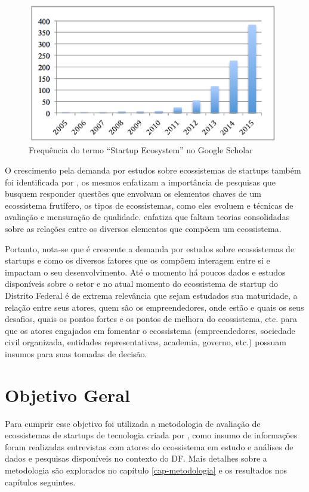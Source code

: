 \begin{figure}[!htb]
	\centering
	\includegraphics[width=11cm,angle=0]{figuras/papers_about_startup_ecosystems}
	\caption{Frequência do termo ``Startup Ecosystem'' no Google Scholar}
	\label{figure:papers_about_startup_ecosystems}
\end{figure}

O crescimento pela demanda por estudos sobre ecossistemas de startups também foi identificada por , os mesmos enfatizam a importância de pesquisas que busquem responder questões que envolvam os elementos chaves de um ecossistema frutífero, os tipos de ecossistemas, como eles evoluem e técnicas de avaliação e mensuração de qualidade.  enfatiza que faltam teorias consolidadas sobre as relações entre os diversos elementos que compõem um ecossistema.

Portanto, nota-se que é crescente a demanda por estudos sobre ecossistemas de startups e como os diversos fatores que os compõem interagem entre si e impactam o seu desenvolvimento. Até o momento há poucos dados e estudos disponíveis sobre o setor e no atual momento do ecossistema de startup do Distrito Federal é de extrema relevância que sejam estudados sua maturidade, a relação entre seus atores, quem são os empreendedores, onde estão e quais os seus desafios, quais os pontos fortes e os pontos de melhora do ecossistema, etc. para que os atores engajados em fomentar o ecossistema (empreendedores, sociedade civil organizada, entidades representativas, academia, governo, etc.) possuam insumos para suas tomadas de decisão. 

\section{Objetivo Geral}
\label{section:objetivo_geral}

Para cumprir esse objetivo foi utilizada a metodologia de avaliação de ecossistemas de startups de tecnologia criada por , como insumo de informações foram realizadas entrevistas com atores do ecossistema em estudo e análises de dados e pesquisas disponíveis no contexto do DF. Mais detalhes sobre a metodologia são explorados no capítulo \ref{cap-metodologia} e os resultados nos capítulos seguintes.


